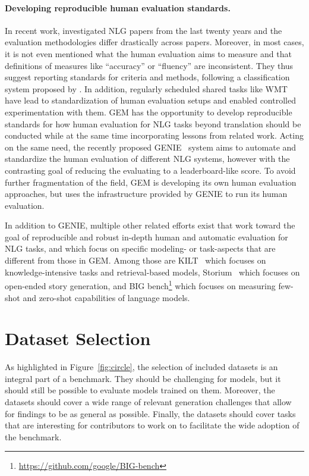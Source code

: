 \documentclass[11pt,a4paper]{article}
\newcommand{\GEM}{\textsc{GEM}}
\begin{document}
 
\paragraph{Developing reproducible human evaluation standards.}

In recent work, \citet{howcroft2020twenty} investigated NLG papers from the last twenty years and the evaluation methodologies differ drastically across papers. Moreover, in most cases, it is not even mentioned what the human evaluation aims to measure and that definitions of measures like ``accuracy'' or ``fluency'' are inconsistent. They thus suggest reporting standards for criteria and methods, following a classification system proposed by \citet{belz2020disentangling}. In addition, regularly scheduled shared tasks like WMT have lead to standardization of human evaluation setups and enabled controlled experimentation with them. \GEM{} has the opportunity to develop reproducible standards for how human evaluation for NLG tasks beyond translation should be conducted while at the same time incorporating lessons from related work. Acting on the same need, the recently proposed GENIE~\citep{khasabi2021genie} system aims to automate and standardize the human evaluation of different NLG systems, however with the contrasting goal of reducing the evaluating to a leaderboard-like score. To avoid further fragmentation of the field, \GEM{} is developing its own human evaluation approaches, but uses the infrastructure provided by GENIE to run its human evaluation. 

In addition to GENIE, multiple other related efforts exist that work toward the goal of reproducible and robust in-depth human and automatic evaluation for NLG tasks, and which focus on specific modeling- or task-aspects that are different from those in \GEM. Among those are KILT~\citep{petroni2020kilt} which focuses on knowledge-intensive tasks and retrieval-based models, Storium~\citep{akoury-etal-2020-storium} which focuses on open-ended story generation, and BIG bench\footnote{\url{https://github.com/google/BIG-bench}} which focuses on measuring few-shot and zero-shot capabilities of language models. 

\section{Dataset Selection}
\label{sec:selection}

As highlighted in Figure~\ref{fig:circle}, the selection of included datasets is an integral part of a benchmark. They should be challenging for models, but it should still be possible to evaluate models trained on them. Moreover, the datasets should cover a wide range of relevant generation challenges that allow for findings to be as general as possible. Finally, the datasets should cover tasks that are interesting for contributors to work on to facilitate the wide adoption of the benchmark. 
\end{document}
